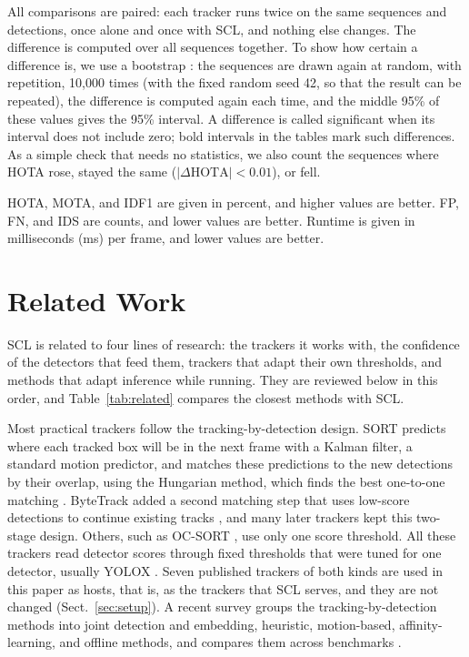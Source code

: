 \documentclass[pdflatex,sn-mathphys-num,iicol]{sn-jnl}
\newcommand{\scl}{SCL}
\begin{document}
All comparisons are paired: each tracker runs twice on the same sequences and
detections, once alone and once with \scl{}, and nothing else changes. The
difference is computed over all sequences together. To show how
certain a difference is, we use a bootstrap \cite{efron1993bootstrap}: the
sequences are drawn again at random, with repetition, 10,000 times (with the
fixed random seed 42, so that the result can be repeated),
the difference is computed again each time, and the middle 95\% of these
values gives the 95\% interval. A difference is called significant when its
interval does not include zero; bold intervals in the tables mark such
differences. As a simple check that needs no statistics, we also count the
sequences where HOTA rose, stayed the same ($|\Delta\mathrm{HOTA}|<0.01$), or
fell.

HOTA, MOTA, and IDF1 are given in percent, and higher values are better. FP,
FN, and IDS are counts, and lower values are better. Runtime is given in
milliseconds (ms) per frame, and lower values are better.
\section{Related Work}\label{sec:related}

\scl{} is related to four lines of research: the trackers it works with, the
confidence of the detectors that feed them, trackers that adapt their own
thresholds, and methods that adapt inference while running. They are
reviewed below in this order, and Table~\ref{tab:related} compares the
closest methods with \scl{}.

Most practical trackers follow the tracking-by-detection design. SORT
predicts where each tracked box will be in the next frame with a Kalman
filter, a standard motion predictor, and matches these predictions to the new
detections by their overlap, using the Hungarian method, which finds the best
one-to-one matching \cite{bewley2016sort}.
ByteTrack added a second matching step that uses low-score detections to
continue existing tracks \cite{zhang2022bytetrack}, and many later trackers
kept this two-stage design. Others, such as OC-SORT \cite{cao2023ocsort}, use
only one score threshold. All these trackers read detector scores through
fixed thresholds that were tuned for one detector, usually YOLOX
\cite{ge2021yolox}. Seven published trackers of both kinds are used in this
paper as hosts, that is, as the trackers that \scl{} serves, and they are not
changed (Sect.~\ref{sec:setup}). A recent survey
groups the tracking-by-detection methods into joint detection and embedding,
heuristic, motion-based, affinity-learning, and offline methods, and compares
them across benchmarks \cite{adzemovic2026survey}.
\end{document}
